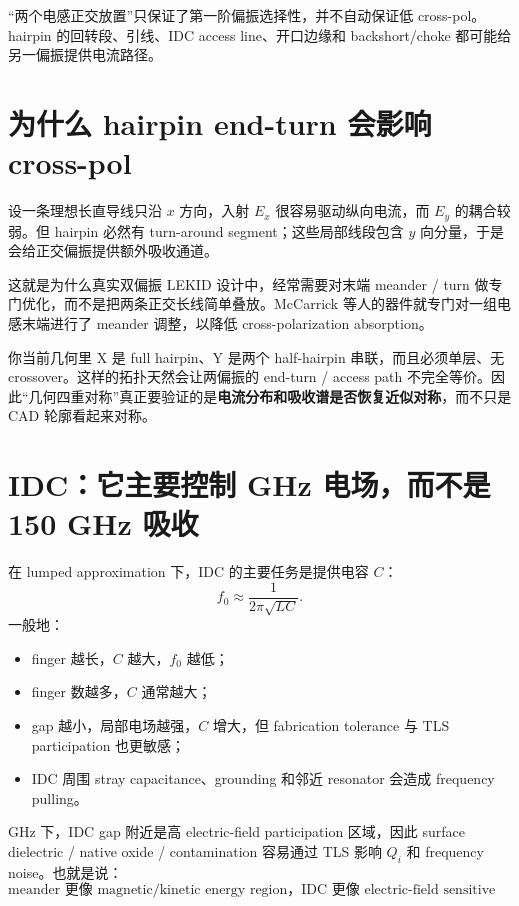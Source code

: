 \documentclass[11pt,a4paper,openany]{ctexrep}
\begin{document}
\begin{mistakebox}
“两个电感正交放置”只保证了第一阶偏振选择性，并不自动保证低 cross-pol。hairpin 的回转段、引线、IDC access line、开口边缘和 backshort/choke 都可能给另一偏振提供电流路径。
\end{mistakebox}

\section{为什么 hairpin end-turn 会影响 cross-pol}

设一条理想长直导线只沿 $x$ 方向，入射 $E_x$ 很容易驱动纵向电流，而 $E_y$ 的耦合较弱。但 hairpin 必然有 turn-around segment；这些局部线段包含 $y$ 向分量，于是会给正交偏振提供额外吸收通道。

这就是为什么真实双偏振 LEKID 设计中，经常需要对末端 meander / turn 做专门优化，而不是把两条正交长线简单叠放。McCarrick 等人的器件就专门对一组电感末端进行了 meander 调整，以降低 cross-polarization absorption。

\begin{projectbox}
你当前几何里 X 是 full hairpin、Y 是两个 half-hairpin 串联，而且必须单层、无 crossover。这样的拓扑天然会让两偏振的 end-turn / access path 不完全等价。因此“几何四重对称”真正要验证的是\textbf{电流分布和吸收谱是否恢复近似对称}，而不只是 CAD 轮廓看起来对称。
\end{projectbox}

\section{IDC：它主要控制 GHz 电场，而不是 150 GHz 吸收}

在 lumped approximation 下，IDC 的主要任务是提供电容 $C$：
\[
f_0\approx\frac{1}{2\pi\sqrt{LC}}.
\]
一般地：
\begin{itemize}
  \item finger 越长，$C$ 越大，$f_0$ 越低；
  \item finger 数越多，$C$ 通常越大；
  \item gap 越小，局部电场越强，$C$ 增大，但 fabrication tolerance 与 TLS participation 也更敏感；
  \item IDC 周围 stray capacitance、grounding 和邻近 resonator 会造成 frequency pulling。
\end{itemize}

GHz 下，IDC gap 附近是高 electric-field participation 区域，因此 surface dielectric / native oxide / contamination 容易通过 TLS 影响 $Q_i$ 和 frequency noise。也就是说：
\[
\boxed{
\text{meander 更像 magnetic/kinetic energy region，IDC 更像 electric-field sensitive region。}
}
\]
\end{document}
